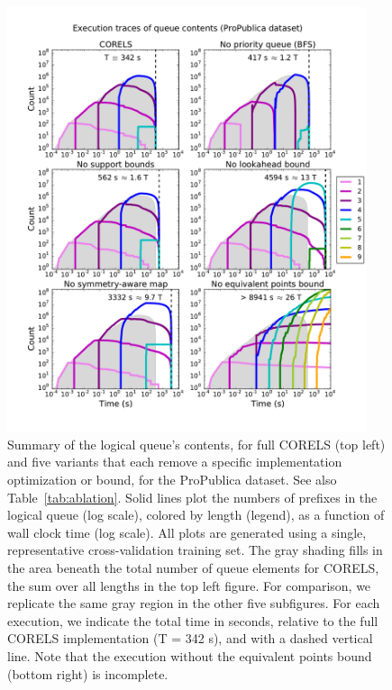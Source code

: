\begin{figure}[t!]
\begin{center}
\includegraphics[trim={15mm 20mm 5mm 25mm},
width=0.94\textwidth]{figs/kdd_compas_ablation-queue.pdf}
\end{center}
\vspace{-5mm}
\caption{Summary of the logical queue's contents, for full CORELS (top left)
and five variants that each remove a specific implementation optimization or bound,
for the ProPublica dataset.  See also Table~\ref{tab:ablation}.
%
%
Solid lines plot the numbers of prefixes in the logical queue (log scale), colored by length (legend),
as a function of wall clock time (log scale).
%
All plots are generated using a single, representative cross-validation training set.
%
%
The gray shading fills in the area beneath the total number of
queue elements for CORELS,
\ie the sum over all lengths in the top left figure.
%
For comparison, we replicate the same gray region
in the other five subfigures.
%
For each execution, we indicate the total time in seconds,
relative to the full CORELS implementation (T = 342 s),
and with a dashed vertical line.
%
Note that the execution without the equivalent points bound (bottom right) is incomplete.
}
\label{fig:queue}
\end{figure}

